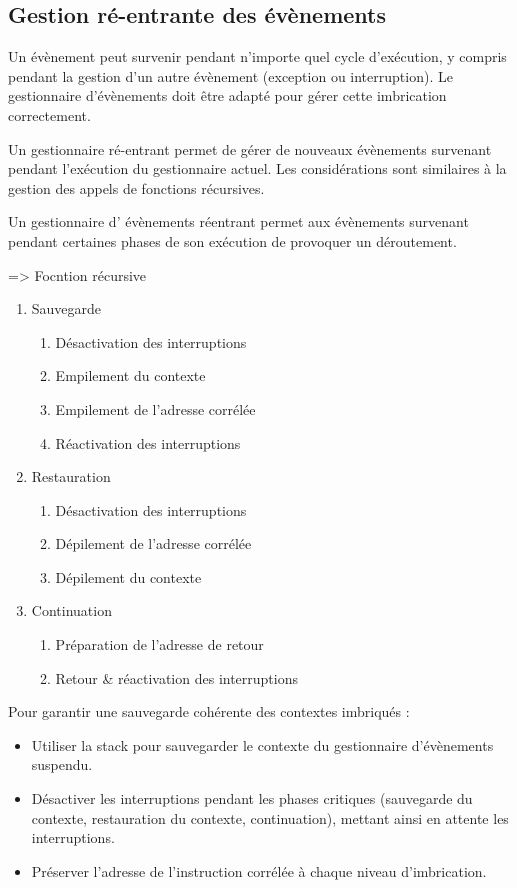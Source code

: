 \subsection{Gestion ré-entrante des évènements}

Un évènement peut survenir pendant n'importe quel cycle d'exécution, y compris pendant la gestion d'un autre évènement (exception ou interruption). 
Le gestionnaire d'évènements doit être adapté pour gérer cette imbrication correctement.

Un gestionnaire ré-entrant permet de gérer de nouveaux évènements survenant pendant l'exécution du gestionnaire actuel. 
Les considérations sont similaires à la gestion des appels de fonctions récursives. 

Un gestionnaire d’ évènements réentrant permet aux  évènements survenant pendant certaines phases de son exécution de provoquer un déroutement.

=> Focntion récursive
\begin{enumerate}
    \item Sauvegarde
    \begin{enumerate}
        \item Désactivation des interruptions
        \item Empilement du contexte 
        \item Empilement de l’adresse corrélée 
        \item Réactivation des interruptions
    \end{enumerate}
    \item Restauration
    \begin{enumerate}
        \item Désactivation des interruptions
        \item Dépilement de l’adresse corrélée 
        \item Dépilement du contexte
    \end{enumerate}
    \item Continuation
    \begin{enumerate}
        \item Préparation de l’adresse de retour 
        \item Retour \& réactivation des interruptions
    \end{enumerate}
\end{enumerate}

Pour garantir une sauvegarde cohérente des contextes imbriqués :
\begin{itemize}
    \item Utiliser la stack pour sauvegarder le contexte du gestionnaire d'évènements suspendu.
    \item Désactiver les interruptions pendant les phases critiques (sauvegarde du contexte, restauration du contexte, continuation), mettant ainsi en attente les interruptions.
    \item Préserver l'adresse de l'instruction corrélée à chaque niveau d'imbrication.
\end{itemize}

